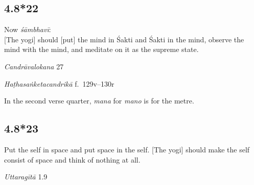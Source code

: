 \begin{ekdosis}
\subsection*{4.8*22}
\begin{translation}[hp04_008_22]
Now \emph{śāmbhavī}:\\
{[}The yogi] should [put] the mind in Śakti and Śakti in the mind, observe the mind with the mind, and meditate on it as the supreme state.
\end{translation}


\begin{sources}[hp04_008_22]
\emph{Candrāvalokana} 27
\begin{versinnote}
\tl{\var{madhyamam ] madhyagaṃ 4340}\\+}
\tl{\var{taṃ dhyāyet ] tad dhyāyet 4340}\\!}
\end{versinnote}
\end{sources}

\begin{testimonia}[hp04_008_22]
\emph{Haṭhasaṅketacandrikā} f.~129v–130r
\begin{versinnote}
\end{versinnote}
\end{testimonia}

\begin{philcomm}[hp04_008_22]
In the second verse quarter, \emph{mana} for \emph{mano} is for the metre.
\end{philcomm}

\subsection*{4.8*23}
\begin{translation}[hp04_008_23]
Put the self in space and put space in the self. [The yogi] should make the self consist of space and think of nothing at all.
\end{translation}

\begin{sources}[hp04_008_23]
\emph{Uttaragītā} 1.9
\begin{versinnote}
\end{versinnote}
\end{sources}


\end{ekdosis}
